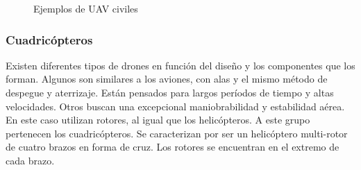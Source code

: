 \begin{figure}[hbtp]
	\centering
	\hspace{5mm}
	\caption{Ejemplos de UAV civiles}	
	\label{FIG:9_historia2}
\end{figure}

\subsubsection{Cuadricópteros}

Existen diferentes tipos de drones en función del diseño y los componentes que los forman. Algunos son similares a los aviones, con alas y el mismo método de despegue y aterrizaje. Están pensados para largos períodos de tiempo y altas velocidades. Otros buscan una excepcional maniobrabilidad y estabilidad aérea. En este caso utilizan rotores, al igual que los helicópteros. A este grupo pertenecen los cuadricópteros. Se caracterizan por ser un helicóptero multi-rotor de cuatro brazos en forma de cruz. Los rotores se encuentran en el extremo de cada brazo. 

